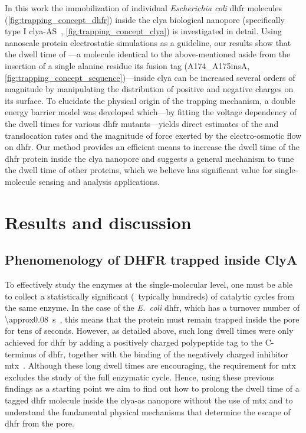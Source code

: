 In this work the immobilization of individual \textit{Escherichia coli} \gls{dhfr} molecules
(\cref{fig:trapping_concept_dhfr}) inside the \gls{clya} biological nanopore (specifically type I
\gls{clya}-AS~\cite{Soskine-2013}, \cref{fig:trapping_concept_clya}) is investigated in detail. Using
nanoscale protein electrostatic simulations as a guideline, our results show that the dwell time of
---a molecule identical to the above-mentioned \DHFRt{} aside from the insertion of a single
alanine residue its fusion tag (A174\_A175insA, \cref{fig:trapping_concept_sequence})---inside \gls{clya} can
be increased several orders of magnitude by manipulating the distribution of positive and negative charges on
its surface. To elucidate the physical origin of the trapping mechanism, a double energy barrier model was
developed which---by fitting the voltage dependency of the dwell times for various \gls{dhfr} mutants---yields
direct estimates of the \cisi{} and \transi{} translocation rates and the magnitude of force exerted by the
electro-osmotic flow on \gls{dhfr}\@. Our method provides an efficient means to increase the dwell time of the
\gls{dhfr} protein inside the \gls{clya} nanopore and suggests a general mechanism to tune the dwell time of
other proteins, which we believe has significant value for single-molecule sensing and analysis applications.


%
\section{Results and discussion}
%
\label{sec:trapping:results_discussion}
%

\subsection{Phenomenology of {DHFR} trapped inside {ClyA}}
%
\label{sec:trapping:phenomenology}
%

To effectively study the enzymes at the single-molecular level, one must be able to collect a statistically
significant (\ie~typically hundreds) of catalytic cycles from the same enzyme. In the case of the
\textit{E.~coli} \gls{dhfr}, which has a turnover number of \SI{\approx0.08}{\second}~\cite{Kohen-2015}, this
means that the protein must remain trapped inside the pore for tens of seconds. However, as detailed above,
such long dwell times were only achieved for \gls{dhfr} by adding a positively charged polypeptide tag to the
C-terminus of \gls{dhfr}, together with the binding of the negatively charged inhibitor
\gls{mtx}~\cite{Soskine-Biesemans-2015}. Although these long dwell times are encouraging, the requirement for
\gls{mtx} excludes the study of the full enzymatic cycle. Hence, using these previous findings as a starting
point we aim to find out how to prolong the dwell time of a tagged \gls{dhfr} molecule inside the
\gls{clya-as} nanopore without the use of \gls{mtx} and to understand the fundamental physical mechanisms that
determine the escape of \gls{dhfr} from the pore.

